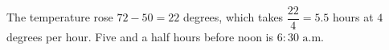 The temperature rose $72-50=22$ degrees, which takes $\dfrac{22}{4}=5.5$ hours at $4$ degrees per hour. Five and a half hours before noon is $\boxed{6\!:\!30\text{ a.m.}}$
